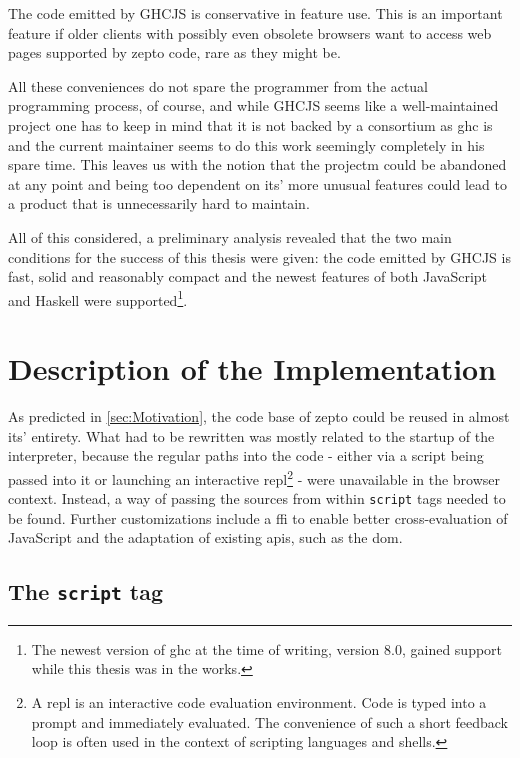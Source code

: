 \documentclass[oneside,11pt,xetex]{scrbook}
\begin{document}
The code emitted by GHCJS is conservative in feature use. This is an important feature if older clients
with possibly even obsolete browsers want to access web pages supported by zepto code, rare as they might
be.

All these conveniences do not spare the programmer from the actual programming process, of course,
and while GHCJS seems like a well-maintained project one has to keep in mind that it is not backed
by a consortium as \gls{ghc} is and the current maintainer seems to do this work seemingly completely
in his spare time. This leaves us with the notion that the projectm could be abandoned at any point
and being too dependent on its' more unusual features could lead to a product that is unnecessarily
hard to maintain.

All of this considered, a preliminary analysis revealed that the two main conditions for the success
of this thesis were given: the code emitted by GHCJS is fast, solid and reasonably compact and the
newest features of both JavaScript and Haskell were supported\footnote{The newest version of \gls{ghc}
at the time of writing, version 8.0, gained support while this thesis was in the works.}.

\section{Description of the Implementation}

As predicted in \ref{sec:Motivation}, the code base of zepto could be reused in almost its' entirety.
What had to be rewritten was mostly related to the startup of the interpreter, because the regular
paths into the code - either via a script being passed into it or launching an interactive
\gls{repl}\footnote{A \gls{repl} is an interactive code evaluation environment. Code is typed into
a prompt and immediately evaluated. The convenience of such a short feedback loop is often used
in the context of scripting languages and shells.} - were unavailable in the browser context.
Instead, a way of passing the sources from within \texttt{script} tags needed to be found. Further
customizations include a \gls{ffi} to enable better cross-evaluation of JavaScript and the adaptation
of existing \gls{api}s, such as the \gls{dom}.

\subsection{The \texttt{script} tag}
\end{document}
